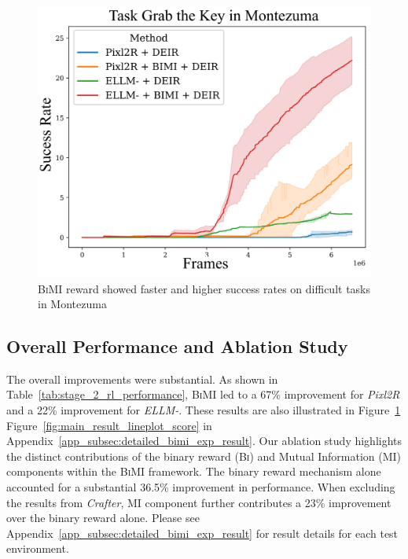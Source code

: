 \documentclass{article}
\theoremstyle{plain}
\theoremstyle{definition}
\theoremstyle{remark}
\begin{document}
\begin{figure}[h]
\begin{minipage}{0.6\textwidth}
\end{minipage}
\hspace{0.1cm}
\begin{minipage}{0.345\textwidth}
    \centering
    \includegraphics[width=\linewidth]{figures/montezuma_difficult_task_success_rate.png}
    \caption{\textsc{BiMI} reward showed faster and higher success rates on difficult tasks in Montezuma} 
    \label{fig:montezuma_difficult_task_success_rate}
\end{minipage}
\end{figure}



\subsection{Overall Performance and Ablation Study}
\label{subsec:ablation}
The overall improvements were substantial. As shown in Table~\ref{tab:stage_2_rl_performance}, \textsc{BiMI} led to a 67\% improvement for \emph{Pixl2R} and a 22\% improvement for \emph{ELLM-}. These results are also illustrated in Figure~\ref{fig:montezuma_difficult_task_success_rate} Figure~\ref{fig:main_result_lineplot_score} in Appendix~\ref{app_subsec:detailed_bimi_exp_result}.
Our ablation study highlights the distinct contributions of the binary reward (\textsc{Bi}) and Mutual Information (\textsc{MI}) components within the \textsc{BiMI} framework. The binary reward mechanism alone accounted for a substantial 36.5\% improvement in performance. When excluding the results from \emph{Crafter}, \textsc{MI} component further contributes a 23\% improvement over the binary reward alone.  Please see Appendix~\ref{app_subsec:detailed_bimi_exp_result} for result details for each test environment.
\end{document}
